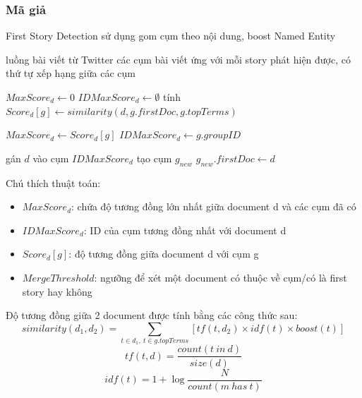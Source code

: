	\subsubsection{Mã giả}
	\begin{algorithm}[H]
		\caption{First Story Detection sử dụng gom cụm theo nội dung, boost Named Entity}
		\begin{algorithmic}[1]
			\REQUIRE luồng bài viết từ Twitter
			\ENSURE các cụm bài viết ứng với mỗi story phát hiện được, có thứ tự xếp hạng giữa các cụm

				\State $MaxScore_d \leftarrow 0$
				\State $IDMaxScore_d \leftarrow \emptyset$
					\State tính $Score_d[g] \leftarrow similarity(d, g.firstDoc, g.topTerms)$
					
						\State $MaxScore_d \leftarrow Score_d[g]$
						\State $IDMaxScore_d \leftarrow g.groupID$
					\ENDIF
				\ENDFOR
				
					\State gán $d$ vào cụm $IDMaxScore_d$
				\ELSE
					\State tạo cụm $g_{new}$
					\State $g_{new}.firstDoc \leftarrow d$
				\ENDIF
			\ENDFOR
		\end{algorithmic}
	\end{algorithm}
	Chú thích thuật toán:
	\begin{itemize}
		\item $MaxScore_d$: chứa độ tương đồng lớn nhất giữa document d và các cụm đã có
		\item $IDMaxScore_d$: ID của cụm tương đồng nhất với document d
		\item $Score_d[g]$: độ tương đồng giữa document d với cụm g 
		\item $MergeThreshold$: ngưỡng để xét một document có thuộc về cụm/có là first story hay không
	\end{itemize}
	Độ tương đồng giữa 2 document được tính bằng các công thức sau:
	\begin{equation}
			similarity(d_1, d_2) = \sum_{t \in d_1,\ t \in g.topTerms}[tf(t, d_2) \times idf(t) \times boost(t)]
	\end{equation}
	\begin{equation}
		tf(t, d) = \frac{count(t \ in\ d)}{size(d)}
	\end{equation}
	\begin{equation}
		idf(t) = 1 + \log\frac{N}{count(m\ has\ t)}
	\end{equation}
